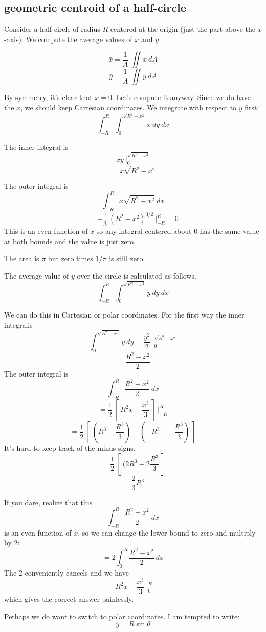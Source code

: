 \documentclass[11pt, oneside]{article}
\begin{document}
\subsection*{geometric centroid of a half-circle}

Consider a half-circle of radius $R$ centered at the origin (just the part above the $x$-axis).  We compute the average values of $x$ and $y$

\[ \bar{x} = \frac{1}{A} \ \iint x \ dA \]
\[ \bar{y} = \frac{1}{A} \ \iint y \ dA \]

By symmetry, it's clear that $\bar{x} = 0$.  Let's compute it anyway.  Since we do have the $x$, we should keep Cartesian coordinates.  We integrate with respect to $y$ first:
\[ \int_{-R}^{R} \int_0^{\sqrt{R^2-x^2}} x \ dy \ dx \]

The inner integral is
\[ xy \ \bigg |_0^{\sqrt{R^2-x^2}} \]
\[ = x \sqrt{R^2-x^2} \]

The outer integral is
\[ \int_{-R}^{R} x \sqrt{R^2-x^2} \ dx \]
\[ = - \frac{1}{3} \ (R^2-x^2)^{3/2} \ \bigg |_{-R}^R = 0 \]
This is an even function of $x$ so any integral centered about $0$ has the same value at both bounds and the value is just zero.  

The area is $\pi$ but zero times $1/\pi$ is still zero.  

The average value of $y$ over the circle is calculated as follows.
\[ \int_{-R}^{R} \int_0^{\sqrt{R^2-x^2}} y \ dy \ dx \]

We can do this in Cartesian or polar coordinates.  For the first way the inner integralis
\[  \int_0^{\sqrt{R^2-x^2}} y \ dy = \frac{y^2}{2} \ \bigg |_0^{\sqrt{R^2-x^2}} \]
\[ = \frac{R^2 - x^2}{2} \]
The outer integral is
\[ \int_{-R}^{R} \frac{R^2 - x^2}{2} \ dx \]
\[ = \frac{1}{2} \ [ \ R^2x - \frac{x^3}{3} \ ] \ \bigg |_{-R}^{R} \]
\[ = \frac{1}{2} \ [ \ (R^3 - \frac{R^3}{3}) - (-R^3 - -\frac{R^3}{3}) \ ] \]
It's hard to keep track of the minus signs.  
\[ = \frac{1}{2} \ [ \ (2R^3 - 2\frac{R^3}{3} \ ] \]
\[ = \frac{2}{3} R^3 \]

If you dare, realize that this
\[ \int_{-R}^{R} \frac{R^2 - x^2}{2} \ dx \]
is an even function of $x$, so we can change the lower bound to zero and multiply by $2$:
\[ = 2 \int_{0}^{R} \frac{R^2 - x^2}{2} \ dx \]
The $2$ conveniently cancels and we have
\[ \ R^2x - \frac{x^3}{3} \ \bigg |_{0}^{R} \]
which gives the correct answer painlessly.

Perhaps we do want to switch to polar coordinates.  I am tempted to write:
\[ y = R \sin \theta \]
\end{document}
